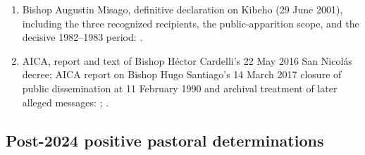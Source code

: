 \begin{enumerate}
  \item Bishop Augustin Misago, definitive declaration on Kibeho (29 June 2001), including the three recognized recipients, the public-apparition scope, and the decisive 1982--1983 period: .
  \item AICA, report and text of Bishop Héctor Cardelli's 22 May 2016 San Nicolás decree; AICA report on Bishop Hugo Santiago's 14 March 2017 closure of public dissemination at 11 February 1990 and archival treatment of later alleged messages: ; .
\end{enumerate}

\subsection{Post-2024 positive pastoral determinations}

